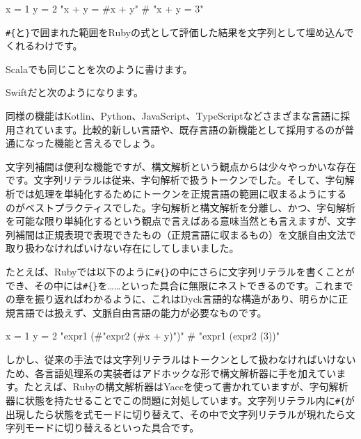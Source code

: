\begin{codescreen}{}
x = 1
y = 2
"x + y = #{x + y}" # "x + y = 3"
\end{codescreen}

\texttt{\#\{}と\texttt{\}}で囲まれた範囲をRubyの式として評価した結果を文字列として埋め込んでくれるわけです。

Scalaでも同じことを次のように書けます。


Swiftだと次のようになります。


同様の機能はKotlin、Python、JavaScript、TypeScriptなどさまざまな言語に採用されています。比較的新しい言語や、既存言語の新機能として採用するのが普通になった機能と言えるでしょう。

文字列補間は便利な機能ですが、構文解析という観点からは少々やっかいな存在です。文字列リテラルは従来、字句解析で扱うトークンでした。そして、字句解析では処理を単純化するためにトークンを正規言語の範囲に収まるようにするのがベストプラクティスでした。字句解析と構文解析を分離し、かつ、字句解析を可能な限り単純化するという観点で言えばある意味当然とも言えますが、文字列補間は正規表現で表現できたもの（正規言語に収まるもの）を文脈自由文法で取り扱わなければいけない存在にしてしまいました。

たとえば、Rubyでは以下のように\texttt{\#\{\}}の中にさらに文字列リテラルを書くことができ、その中には\texttt{\#\{\}}を……といった具合に無限にネストできるのです。これまでの章を振り返ればわかるように、これはDyck言語的な構造があり、明らかに正規言語では扱えず、文脈自由言語の能力が必要なものです。

\begin{codescreen}{}
x = 1
y = 2
"expr1 (#{"expr2 (#{x + y})"})" # "expr1 (expr2 (3))"
\end{codescreen}

しかし、従来の手法では文字列リテラルはトークンとして扱わなければいけないため、各言語処理系の実装者はアドホックな形で構文解析器に手を加えています。たとえば、Rubyの構文解析器はYaccを使って書かれていますが、字句解析器に状態を持たせることでこの問題に対処しています。文字列リテラル内に\texttt{\#\{}が出現したら状態を式モードに切り替えて、その中で文字列リテラルが現れたら文字列モードに切り替えるといった具合です。


